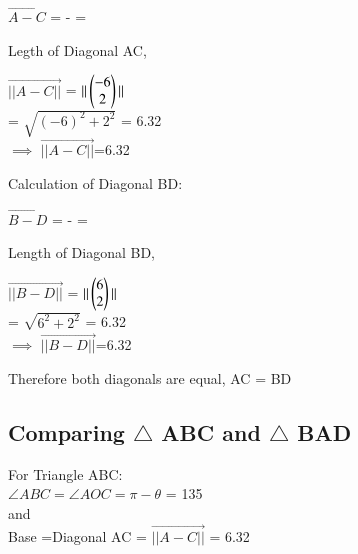 \documentclass[journal,10pt,twocolumn]{article}
\begin{document}
\begin{flushleft}
\vspace{0.1cm}

$\vec{A-C}$ =  -  = 
	\\
\begin{flushleft}
Legth of Diagonal AC,\\
\end{flushleft}


$\vec{||A-C||}$ = $ || \begin{pmatrix}-6 \\ 2\end{pmatrix} ||$
	\\
\vspace{0.25cm}
= $\sqrt{(-6)^2+2^2}$ = 6.32\\
\vspace{0.3cm}
$\implies$ $\vec{||A-C||}$=6.32\\

\vspace{0.3cm}
\begin{flushleft}
Calculation of Diagonal BD:\\
\end{flushleft}

\vspace{0.25cm}

$\vec{B-D}$ = -  = 
	\\
\begin{flushleft}
Length of Diagonal BD,\\
\end{flushleft}

$\vec{||B-D||}$ =  $||\begin{pmatrix}6 \\2\end{pmatrix}||$
	\\
\vspace{0.25cm}
= $\sqrt{6^2+2^2}$ = 6.32\\
\vspace{0.25cm}
$\implies$ $\vec{||B-D||}$=6.32\\
\begin{flushleft}
Therefore both diagonals are equal,  AC = BD \\
\end{flushleft}

\subsection{Comparing $\triangle$ ABC and $\triangle$ BAD }
\begin{flushleft}
\vspace{0.25cm}
For Triangle ABC:\\
\vspace{0.25cm}
$\angle ABC = \angle AOC = \pi -\theta$ = 135 \textdegree \\
\vspace{0.25cm}
and\\
\vspace{0.25cm}
Base =Diagonal AC  = $\vec{||A-C||}$ = 6.32\\
\vspace{0.35cm}


\end{flushleft}
\end{flushleft}
\end{document}
